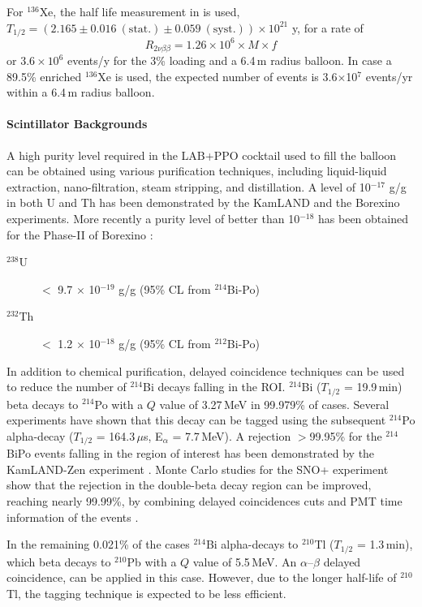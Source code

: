 For $^{136}$Xe, the half life measurement in \cite{gando16, exo14} is used,
$T_{1/2}=(2.165\pm0.016~\mathrm{(stat.)}\pm0.059~\mathrm{(syst.)})\times10^{21}$
y, for a rate of
\begin{equation}
R_{2\nu\beta\beta} = 1.26 \times 10^{6} \times M \times f
\end{equation} 
or $3.6\times10^6$ events/y for the 3\% loading and a 6.4\,m radius balloon.
In case a 89.5\% enriched $^{136}$Xe is used, the expected number of events is
3.6$\times$10$^{7}$ events/yr within a 6.4\,m radius balloon.
 
\paragraph{Scintillator Backgrounds}
A high purity level required in the LAB+PPO cocktail used to fill the balloon
can be obtained using various purification techniques, including liquid-liquid
extraction, nano-filtration, steam stripping, and distillation. A level
of 10$^{-17}$ g/g in both U and Th has been demonstrated by the
KamLAND \cite{kam03} and the Borexino \cite{bxo09} experiments. More recently
a purity level of better than 10$^{-18}$ has been obtained for the Phase-II
of Borexino \cite{bxo16}:
\begin{description}
\item[$^{238}$U] $<$ 9.7 $\times$ 10$^{-19}$ g/g (95\% CL from $^{214}$Bi-Po)
\item[$^{232}$Th] $<$ 1.2 $\times$ 10$^{-18}$ g/g (95\% CL from $^{212}$Bi-Po)
\end{description}

In addition to chemical purification, delayed coincidence techniques can
be used to reduce the number of $^{214}$Bi decays falling in the ROI.
$^{214}$Bi ($T_{1/2}$ = 19.9\,min) beta decays to $^{214}$Po with a $Q$ value
of 3.27\,MeV in 99.979\% of cases. Several experiments have shown that this
decay can be tagged using the subsequent $^{214}$Po alpha-decay
($T_{1/2}$ = 164.3\,$\mu$s, E$_{\alpha}$ = 7.7\,MeV). 
A rejection $>$99.95\% for the $^{214}$BiPo events falling in the region of interest has been 
demonstrated by the KamLAND-Zen experiment \cite{KD-Zen}. Monte Carlo studies for the SNO+ experiment show that the rejection in the double-beta decay region can be improved, reaching nearly 99.99\%, by combining delayed coincidences cuts and PMT time information of the events \cite{snop16}.

In the remaining 0.021\% of the cases $^{214}$Bi alpha-decays to $^{210}$Tl
($T_{1/2}$ = 1.3\,min), which beta decays to $^{210}$Pb with a $Q$ value of
5.5\,MeV. An $\alpha$--$\beta$ delayed coincidence, can be applied in this
case. However, due to the longer half-life of $^{210}$Tl, the tagging
technique is expected to be less efficient.

